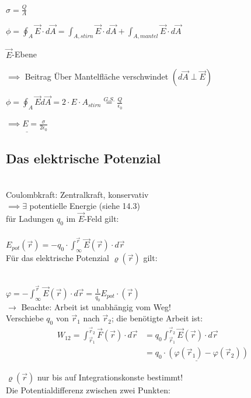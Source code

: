 \documentclass[11pt]{article}
\begin{document}
\hfill\\

$ \sigma=\frac{Q}{A} $

$ \displaystyle\phi = \oint_{A}\vec{E}\cdot d\vec{A}=\int_{A, stirn}^{} \vec{E}\cdot d\vec{A}+\int_{A, mantel}^{} \vec{E}\cdot d\vec{A}   $

$ \vec{E} $-Ebene

$ \implies $ Beitrag Über Mantelfläche verschwindet $ (d\vec{A}\perp\vec{E}) $

$ \phi=\oint_{A} \vec{E}d\vec{A}=2\cdot E\cdot A_{stirn}\overset{G.S.}{=}\frac{Q}{\epsilon_0}$ 

$ \underline{\implies E=\frac{\sigma}{2\epsilon_0}} $

\subsection{Das elektrische Potenzial}\\

Coulombkraft: Zentralkraft, konservativ\\
$\implies \exists$ potentielle Energie (siehe 14.3)\\
für Ladungen $q_0$ im $\vec{E}$-Feld gilt:\\

\hfill\\
$\boxed{\displaystyle E_{pot}(\vec{r})=-q_0\cdot\int_{\infty}^{\vec{r}} \vec{E}(\vec{r})\cdot d\vec{r}}$
\hfill\\

Für das elektrische Potenzial $ \varrho(\vec{r}) $ gilt:

\hfill\\
$\boxed{\displaystyle\varphi=-\int_{\infty}^{\vec{r}} \vec{E}(\vec{r})\cdot d\vec{r} = \frac{1}{q_0}E_{pot}\cdot (\vec{r})}$
\hfill\\

$\rightarrow$ Beachte: Arbeit ist unabhängig vom Weg!\\
Verschiebe $q_0$ von $\vec{r}_1$ nach $\vec{r}_2$; die benötigte Arbeit ist:\\

\begin{align*}
	\displaystyle W_{12}= \int_{\vec{r}_1}^{\vec{r}_2} \vec{F}(\vec{r})\cdot d\vec{r} & = q_0\int_{\vec{r}_1}^{\vec{r}_2} \vec{E}(\vec{r})\cdot d\vec{r} \\
	&\underline{ =q_0\cdot(\varphi(\vec{r}_1)-\varphi(\vec{r}_2))}
\end{align*}

$ \varrho(\vec{r}) $ nur bis auf Integrationskonste bestimmt!\\
Die Potentialdifferenz zwischen zwei Punkten:\\
\end{document}

